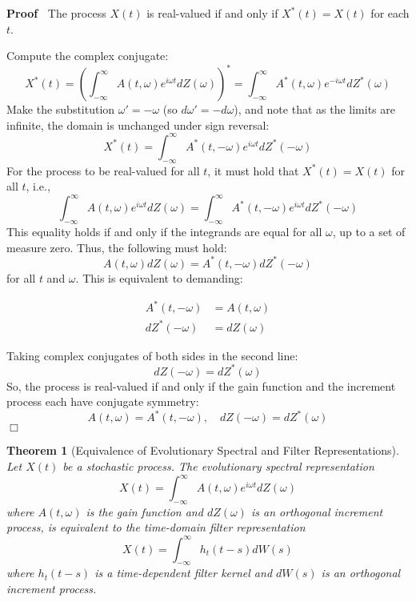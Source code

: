 \documentclass{article}
\newenvironment{proof}{\noindent\textbf{Proof\ }}{\hspace*{\fill}$\Box$\medskip}
\newtheorem{theorem}{Theorem}
\begin{document}
\begin{proof}
  The process $X (t)$ is real-valued if and only if $X^{\ast} (t) = X (t)$ for
  each $t$.
  
  Compute the complex conjugate:
  \[ X^{\ast} (t) = \left( \int_{- \infty}^{\infty} A (t, \omega) e^{i \omega
     t} dZ (\omega) \right)^{\ast} = \int_{- \infty}^{\infty} A^{\ast} (t,
     \omega) e^{- i \omega t} dZ^{\ast} (\omega) \]
  Make the substitution $\omega' = - \omega$ (so $d \omega' = - d \omega$),
  and note that as the limits are infinite, the domain is unchanged under sign
  reversal:
  \[ X^{\ast} (t) = \int_{- \infty}^{\infty} A^{\ast} (t, - \omega) e^{i
     \omega t} dZ^{\ast}  (- \omega) \]
  For the process to be real-valued for all $t$, it must hold that $X^{\ast}
  (t) = X (t)$ for all $t$, i.e.,
  \[ \int_{- \infty}^{\infty} A (t, \omega) e^{i \omega t} dZ (\omega) =
     \int_{- \infty}^{\infty} A^{\ast} (t, - \omega) e^{i \omega t} dZ^{\ast} 
     (- \omega) \]
  This equality holds if and only if the integrands are equal for all
  $\omega$, up to a set of measure zero. Thus, the following must hold:
  \[ A (t, \omega) dZ (\omega) = A^{\ast} (t, - \omega) dZ^{\ast}  (- \omega)
  \]
  for all $t$ and $\omega$. This is equivalent to demanding:
  
  \begin{align*}
    A^{\ast} (t, - \omega) & = A (t, \omega)\\
    dZ^{\ast}  (- \omega) & = dZ (\omega)
  \end{align*}
  
  Taking complex conjugates of both sides in the second line:
  \[ dZ (- \omega) = dZ^{\ast} (\omega) \]
  So, the process is real-valued if and only if the gain function and the
  increment process each have conjugate symmetry:
  \[ A (t, \omega) = A^{\ast} (t, - \omega), \quad dZ (- \omega) = dZ^{\ast}
     (\omega) \]
\end{proof}

\begin{theorem}
  [Equivalence of Evolutionary Spectral and Filter Representations] Let $X
  (t)$ be a stochastic process. The evolutionary spectral representation
  \begin{equation}
    X (t) = \int_{- \infty}^{\infty} A (t, \omega) e^{i \omega t} dZ (\omega)
  \end{equation}
  where $A (t, \omega)$ is the gain function and $dZ (\omega)$ is an
  orthogonal increment process, is equivalent to the time-domain filter
  representation
  \begin{equation}
    X (t) = \int_{- \infty}^{\infty} h_t  (t - s) dW (s)
  \end{equation}
  where $h_t  (t - s)$ is a time-dependent filter kernel and $dW (s)$ is an
  orthogonal increment process.
\end{theorem}
\end{document}
